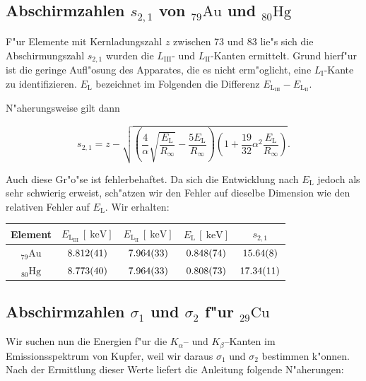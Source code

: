 	\subsection{Abschirmzahlen $s_{2,1}$ von ${}_{79}^{}\mathrm{Au}$ und ${}_{80}^{}\mathrm{Hg}$}
		\label{subsec:abschirm2}
		F"ur Elemente mit Kernladungszahl $z$ zwischen 73 und 83 lie"s sich die Abschirmungszahl $s_{2,1}$ wurden die $L_\mathrm{III}$- und $L_\mathrm{II}$-Kanten ermittelt.
		Grund hierf"ur ist die geringe Aufl"osung des Apparates, die es nicht erm"oglicht, eine $L_\mathrm{I}$-Kante zu identifizieren.
		$E_\mathrm{L}$ bezeichnet im Folgenden die Differenz $E_\mathrm{L_\mathrm{III}} - E_\mathrm{L_\mathrm{II}}$.
		
		N"aherungsweise gilt dann

		\begin{equation}
			s_{2,1} = z - \sqrt{\left( \frac{4}{\alpha} \sqrt{\frac{E_\mathrm{L}}{R_\infty}} - \frac{5 E_\mathrm{L}}{R_\infty} \right)
			\left( 1 + \frac{19}{32}\alpha^2 \frac{E_\mathrm{L}}{R_\infty} \right)} . \nonumber
		\end{equation}

		Auch diese Gr"o"se ist fehlerbehaftet.
		Da sich die Entwicklung nach $E_\mathrm{L}$ jedoch als sehr schwierig erweist, sch"atzen wir den Fehler auf dieselbe Dimension wie den relativen Fehler auf $E_\mathrm{L}$. Wir erhalten:

		\begin{table}[h!]
			\centering
			\begin{tabular}{|c|c|c|c|c|}
				\hline
				Element & 
				$E_\mathrm{L_\mathrm{III}}\,[\SI{}{\kilo \electronvolt}]$ &
				$E_\mathrm{L_\mathrm{II}}\,[\SI{}{\kilo \electronvolt}]$ &
				$E_\mathrm{L}\,[\SI{}{\kilo \electronvolt}]$ & 
				$s_{2,1}$ \\
				\hline \hline
				${}_{79}^{}\mathrm{Au}$ & 
					$\SI{8.812 (41)}{}$ &
					$\SI{7.964 (33)}{}$ & 
					$\SI{.848 (74)}{}$ & 
					$\SI{15.64 (8)}{}$ \\
				${}_{80}^{}\mathrm{Hg}$ & 
					$\SI{8.773 (40)}{}$ &
					$\SI{7.964 (33)}{}$ &
					$\SI{.808 (73)}{}$ & 
					$\SI{17.34 (11)}{}$ \\
				\hline
			\end{tabular}
		\end{table}

	\subsection{Abschirmzahlen $\sigma_1$ und $\sigma_2$ f"ur ${}_{29}^{}\mathrm{Cu}$}
		\label{subsec:kupfer}
		Wir suchen nun die Energien f"ur die $K_\alpha$-- und $K_\beta$--Kanten im Emissionsspektrum von Kupfer, weil wir daraus $\sigma_1$ und $\sigma_2$ bestimmen k"onnen.
		Nach der Ermittlung dieser Werte liefert die Anleitung folgende N"aherungen:

